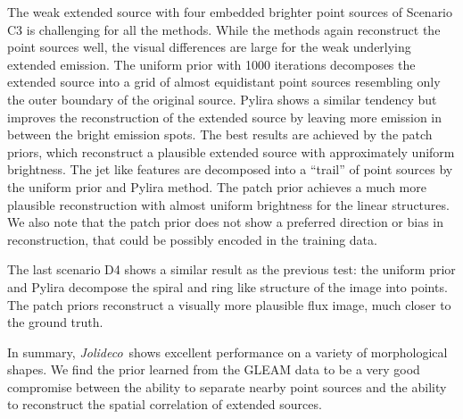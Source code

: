 \documentclass[twocolumn]{aastex631}
\newcommand{\jolideco}{\textit{Jolideco}~}
\begin{document}
    The weak extended source with four embedded brighter point sources of Scenario C3 is challenging for all the methods. While the methods again reconstruct the point sources well, the visual differences are large for the weak underlying extended emission. The uniform prior with 1000 iterations decomposes the extended source into a grid of almost equidistant point sources resembling only the outer boundary of the original source. Pylira shows a similar tendency but improves the reconstruction of the extended source by leaving more emission in between the bright emission spots. The best results are achieved by the patch priors, which reconstruct a plausible extended source with approximately uniform brightness. The jet like features are decomposed into a \enquote{trail} of point sources by the uniform prior and Pylira method. The patch prior achieves a much more plausible reconstruction with almost uniform brightness for the linear structures. We also note that the patch prior does not show a preferred direction or bias in reconstruction, that could be possibly encoded in the training data.
    
    The last scenario D4 shows a similar result as the previous test: the uniform prior and Pylira decompose the spiral and ring like structure of the image into points. The patch priors reconstruct a visually more plausible flux image, much closer to the ground truth.

    In summary, \jolideco shows excellent performance on a variety of morphological shapes. We find the prior learned from the GLEAM data to be a very good compromise between the ability to separate nearby point sources and the ability to reconstruct the spatial correlation of extended sources.
    
\end{document}

